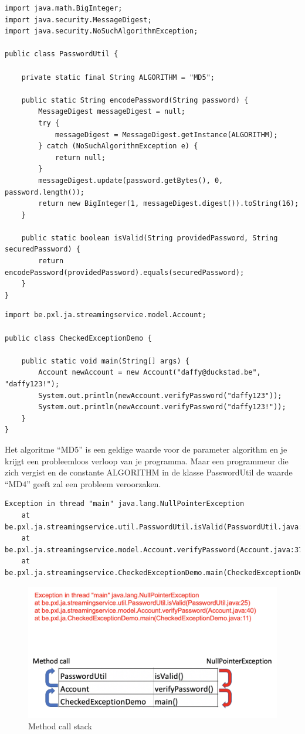 \begin{lstlisting}
import java.math.BigInteger;
import java.security.MessageDigest;
import java.security.NoSuchAlgorithmException;

public class PasswordUtil {

	private static final String ALGORITHM = "MD5";

	public static String encodePassword(String password) {
		MessageDigest messageDigest = null;
		try {
			messageDigest = MessageDigest.getInstance(ALGORITHM);
		} catch (NoSuchAlgorithmException e) {
			return null;
		}
		messageDigest.update(password.getBytes(), 0, password.length());
		return new BigInteger(1, messageDigest.digest()).toString(16);
	}

	public static boolean isValid(String providedPassword, String securedPassword) {
		return encodePassword(providedPassword).equals(securedPassword);
	}
}
\end{lstlisting}


\begin{lstlisting}
import be.pxl.ja.streamingservice.model.Account;

public class CheckedExceptionDemo {

	public static void main(String[] args) {
		Account newAccount = new Account("daffy@duckstad.be", "daffy123!");
		System.out.println(newAccount.verifyPassword("daffy123"));
		System.out.println(newAccount.verifyPassword("daffy123!"));
	}
}
\end{lstlisting}

Het algoritme ``MD5'' is een geldige waarde voor de parameter algorithm en je krijgt een probleemloos verloop van je programma. Maar een programmeur die zich vergist en de constante ALGORITHM in de klasse PasswordUtil de waarde ``MD4'' geeft zal een probleem veroorzaken.

\begin{verbatim}
Exception in thread "main" java.lang.NullPointerException
	at be.pxl.ja.streamingservice.util.PasswordUtil.isValid(PasswordUtil.java:24)
	at be.pxl.ja.streamingservice.model.Account.verifyPassword(Account.java:37)
	at be.pxl.ja.streamingservice.CheckedExceptionDemo.main(CheckedExceptionDemo.java:9)
\end{verbatim}

\begin{figure}[H]
\includegraphics[width=\linewidth]{images/h2/exception_call_stack.png}
\caption{Method call stack}
\label{fig:method_call_stack}
\end{figure}

